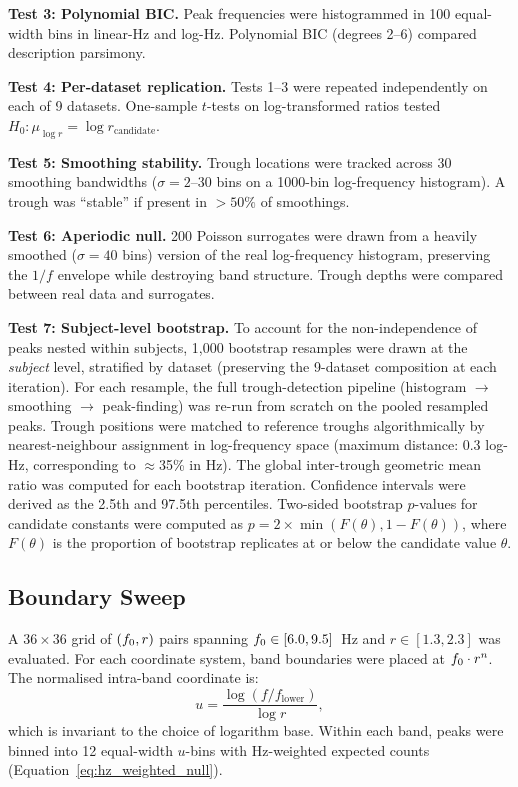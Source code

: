 \textbf{Test 3: Polynomial BIC.} Peak frequencies were histogrammed in 100 equal-width bins in linear-Hz and log-Hz. Polynomial BIC (degrees 2--6) compared description parsimony.

\textbf{Test 4: Per-dataset replication.} Tests 1--3 were repeated independently on each of 9 datasets. One-sample $t$-tests on log-transformed ratios tested $H_0: \mu_{\log r} = \log r_\text{candidate}$.

\textbf{Test 5: Smoothing stability.} Trough locations were tracked across 30 smoothing bandwidths ($\sigma = 2$--30 bins on a 1000-bin log-frequency histogram). A trough was ``stable'' if present in $>50\%$ of smoothings.

\textbf{Test 6: Aperiodic null.} 200 Poisson surrogates were drawn from a heavily smoothed ($\sigma = 40$ bins) version of the real log-frequency histogram, preserving the $1/f$ envelope while destroying band structure. Trough depths were compared between real data and surrogates.

\textbf{Test 7: Subject-level bootstrap.} To account for the non-independence of peaks nested within subjects, 1,000 bootstrap resamples were drawn at the \emph{subject} level, stratified by dataset (preserving the 9-dataset composition at each iteration). For each resample, the full trough-detection pipeline (histogram $\to$ smoothing $\to$ peak-finding) was re-run from scratch on the pooled resampled peaks. Trough positions were matched to reference troughs algorithmically by nearest-neighbour assignment in log-frequency space (maximum distance: 0.3 log-Hz, corresponding to $\approx$35\% in Hz). The global inter-trough geometric mean ratio was computed for each bootstrap iteration. Confidence intervals were derived as the 2.5th and 97.5th percentiles. Two-sided bootstrap $p$-values for candidate constants were computed as $p = 2 \times \min(F(\theta), 1 - F(\theta))$, where $F(\theta)$ is the proportion of bootstrap replicates at or below the candidate value $\theta$.

\subsection{Boundary Sweep}
\label{sec:sweep_methods}

A $36 \times 36$ grid of $(f_0, r)$ pairs spanning $f_0 \in [6.0, 9.5]$~Hz and $r \in [1.3, 2.3]$ was evaluated. For each coordinate system, band boundaries were placed at $f_0 \cdot r^n$. The normalised intra-band coordinate is:
\begin{equation}
u = \frac{\log(f / f_\text{lower})}{\log r},
\end{equation}
which is invariant to the choice of logarithm base. Within each band, peaks were binned into 12 equal-width $u$-bins with Hz-weighted expected counts (Equation~\ref{eq:hz_weighted_null}).

